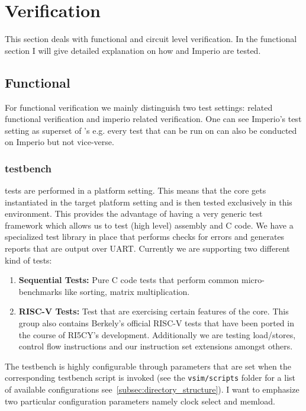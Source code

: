 \section{Verification}

This section deals with functional and circuit level verification. In the functional section I will give detailed explanation on how \pulpino and Imperio are tested.

\subsection{Functional}

For functional verification we mainly distinguish two test settings: \pulpino related functional verification and imperio related verification. One can see Imperio's test setting as superset of \pulpino's e.g. every test that can be run on \pulpino can also be conducted on Imperio but not vice-verse.

\subsubsection{\pulpino testbench}

\pulpino tests are performed in a platform setting. This means that the core gets instantiated in the target platform setting and is then tested exclusively in this environment. This provides the advantage of having a very generic test framework which allows us to test (high level) assembly and C code. We have a specialized test library in place that performs checks for errors and generates reports that are output over UART. Currently we are supporting two different kind of tests:
\begin{enumerate}
    \item \textbf{Sequential Tests:} Pure C code tests that perform common micro-benchmarks like sorting, matrix multiplication.
    \item \textbf{RISC-V Tests:} Test that are exercising certain features of the core. This group also contains Berkely's official RISC-V tests that have been ported in the course of RI5CY's development. Additionally we are testing load/stores, control flow instructions and our instruction set extensions amongst others.
\end{enumerate}

The testbench is highly configurable through parameters that are set when the corresponding testbench script is invoked (see the \verb+vsim/scripts+ folder for a list of available configurations see~\ref{subsec:directory_structure}). I want to emphasize two particular configuration parameters namely clock select and memload. 

